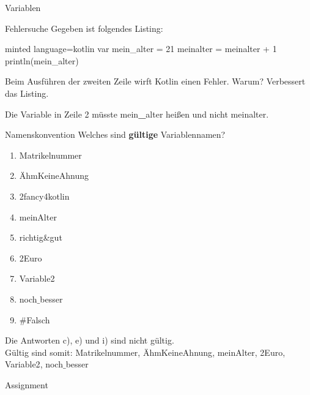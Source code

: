 \begin{task}[points=auto]{Variablen }
    \begin{subtask*}[points=0]{Fehlersuche}
        Gegeben ist folgendes Listing:
        \begin{codeBlock}[]{minted language=kotlin}
            var mein_alter = 21
            meinalter = meinalter + 1
            println(mein_alter)
        \end{codeBlock}
        Beim Ausführen der zweiten Zeile wirft Kotlin einen Fehler. Warum? Verbessert das Listing.
        \begin{solution}
            Die Variable in Zeile 2 müsste {\ttfamily mein\textbf{\_}alter} heißen und nicht {\ttfamily meinalter}.
        \end{solution}
    \end{subtask*}
    \begin{subtask*}[points=0]{Namenskonvention}
        Welches sind \textbf{gültige} Variablennamen?
        \begin{multicols}{3}
            \begin{enumerate}[label=(\alph*)]
                \item {\ttfamily Matrikelnummer}
                \item {\ttfamily ÄhmKeineAhnung}
                \item {\ttfamily 2fancy4kotlin}
                \item {\ttfamily {\_}meinAlter}
                \item {\ttfamily richtig\&gut}
                \item {\ttfamily {\_}2Euro}
                \item {\ttfamily Variable2}
                \item {\ttfamily noch$\_$besser}
                \item {\ttfamily \#Falsch}
            \end{enumerate}
        \end{multicols}
        \begin{solution}
            Die Antworten c), e) und i) sind nicht gültig.\\Gültig sind somit: {\ttfamily Matrikelnummer}, {\ttfamily ÄhmKeineAhnung}, {\ttfamily {\_}meinAlter}, {\ttfamily {\_}2Euro}, {\ttfamily Variable2}, {\ttfamily noch$\_$besser}
        \end{solution}
    \end{subtask*}
    \begin{subtask*}[points=0]{Assignment}

\end{subtask*}
\end{task}
